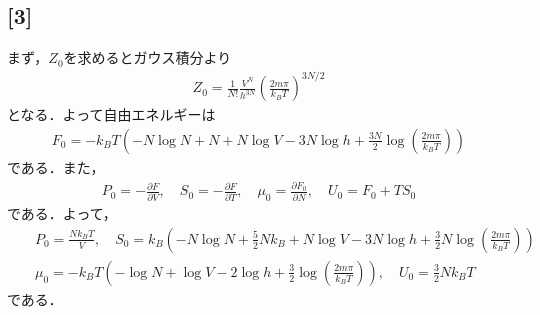 \documentclass[12pt,dvipdfmx]{jsarticle}
\begin{document}
\subsection*{\large{[3]}}
まず，$Z_0$を求めるとガウス積分より
\begin{eqnarray}
  Z_0 = \frac{1}{N!}\frac{V^{N}}{h^{3N}}\left( \frac{2m\pi}{k_B T} \right)^{3N/2}
\end{eqnarray}
となる．よって自由エネルギーは
\begin{eqnarray}
  F_0 = -k_BT \left( -N\log N +N + N\log V -3N\log h + \frac{3N}{2}\log\left( \frac{2m\pi}{k_B T} \right) \right)
\end{eqnarray}
である．また，
\begin{eqnarray}
  P_0 = -\frac{\partial F}{\partial V}, \quad S_0=-\frac{\partial F}{\partial T},\quad \mu_0 = \frac{\partial F_0}{\partial N}, \quad U_0 = F_0 + T S_0
\end{eqnarray}
である．よって，
\begin{eqnarray}
  &&P_0 = \frac{Nk_B T}{V}, \quad S_0 = k_B \left( -N\log N + \frac{5}{2}Nk_B + N\log V-3N\log h + \frac{3}{2}N\log\left( \frac{2m\pi}{k_B T} \right) \right)\\
  &&\mu_0 = -k_B T\left( -\log N + \log V -2\log h + \frac{3}{2}\log\left( \frac{2m\pi}{k_B T} \right) \right), \quad U_0 = \frac{3}{2}Nk_B T
\end{eqnarray}
である．
\end{document}
